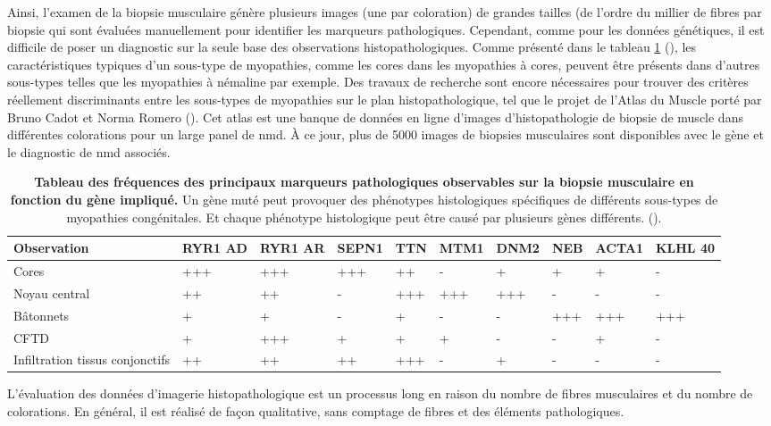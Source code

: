 Ainsi, l'examen de la biopsie musculaire génère plusieurs images (une par coloration) de grandes tailles (de l'ordre du millier de fibres par biopsie qui sont évaluées manuellement pour identifier les marqueurs pathologiques. Cependant, comme pour les données génétiques, il est difficile de poser un diagnostic sur la seule base des observations histopathologiques. Comme présenté dans le tableau \ref{tab:histopath} (\cite{jungbluth_congenital_2018}), les caractéristiques typiques d'un sous-type de myopathies, comme les cores dans les myopathies à cores, peuvent être présents dans d'autres sous-types telles que les myopathies à némaline par exemple. Des travaux de recherche sont encore nécessaires pour trouver des critères réellement discriminants entre les sous-types de myopathies sur le plan histopathologique, tel que le projet de l'Atlas du Muscle porté par Bruno Cadot et Norma Romero (\cite{cadot_atlas_2022}). Cet atlas est une banque de données en ligne d'images d'histopathologie de biopsie de muscle dans différentes colorations pour un large panel de \gls{nmd}. À ce jour, plus de 5000 images de biopsies musculaires sont disponibles avec le gène et le diagnostic de \gls{nmd} associés. 

\begin{table}[!ht]
\begin{tabularx}{\textwidth}{|p{1.8cm}|X|X|X|X|X|X|X|X|X|}
 \hline
\textbf{Observation} & \textbf{RYR1 AD} & \textbf{RYR1 AR} & \textbf{SEPN1} & \textbf{TTN} & \textbf{MTM1} & \textbf{DNM2} & \textbf{NEB} & \textbf{ACTA1} & \textbf{KLHL 40} \\
\hline
Cores & +++ & +++ & +++ & ++ & - & + & + & + & - \\
\hline
Noyau central & ++ & ++ & - & +++ & +++ & +++ & - & - & - \\
\hline
Bâtonnets & + & + & - & + & - & - & +++ & +++ & +++ \\
\hline
CFTD & + & +++ & + & + & + & - & - & + & - \\
\hline
Infiltration tissus conjonctifs & ++ & ++ & ++ & +++ & - & + & - & - & - \\
\hline
\end{tabularx}
\caption[Tableau des fréquences des principaux marqueurs pathologiques en biopsie musculaire.]{\textbf{Tableau des fréquences des principaux marqueurs pathologiques observables sur la biopsie musculaire en fonction du gène impliqué.} Un gène muté peut provoquer des phénotypes histologiques spécifiques de différents sous-types de myopathies congénitales. Et chaque phénotype histologique peut être causé par plusieurs gènes différents. (\cite{jungbluth_congenital_2018}).} 
\label{tab:histopath}
\end{table}
L'évaluation des données d'imagerie histopathologique est un processus long en raison du nombre de fibres musculaires et du nombre de colorations. En général, il est réalisé de façon qualitative, sans comptage de fibres et des éléments pathologiques.

